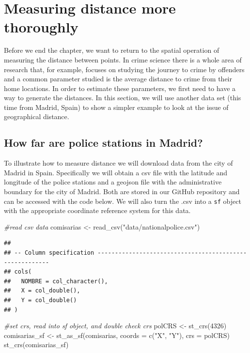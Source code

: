 \documentclass[
]{book}
\newenvironment{Shaded}{\begin{snugshade}}{\end{snugshade}}
\newcommand{\AttributeTok}[1]{\textcolor[rgb]{0.77,0.63,0.00}{#1}}
\newcommand{\CommentTok}[1]{\textcolor[rgb]{0.56,0.35,0.01}{\textit{#1}}}
\newcommand{\DecValTok}[1]{\textcolor[rgb]{0.00,0.00,0.81}{#1}}
\newcommand{\FunctionTok}[1]{\textcolor[rgb]{0.00,0.00,0.00}{#1}}
\newcommand{\NormalTok}[1]{#1}
\newcommand{\OtherTok}[1]{\textcolor[rgb]{0.56,0.35,0.01}{#1}}
\newcommand{\StringTok}[1]{\textcolor[rgb]{0.31,0.60,0.02}{#1}}
\begin{document}
\hypertarget{measuring-distance-more-thoroughly}{%
\section{Measuring distance more thoroughly}\label{measuring-distance-more-thoroughly}}

Before we end the chapter, we want to return to the spatial operation of measuring the distance between points. In crime science there is a whole area of research that, for example, focuses on studying the journey to crime by offenders and a common parameter studied is the average distance to crime from their home locations. In order to estimate these parameters, we first need to have a way to generate the distances. In this section, we will use another data set (this time from Madrid, Spain) to show a simpler example to look at the issue of geographical distance.

\hypertarget{how-far-are-police-stations-in-madrid}{%
\subsection{How far are police stations in Madrid?}\label{how-far-are-police-stations-in-madrid}}

To illustrate how to measure distance we will download data from the city of Madrid in Spain. Specifically we will obtain a csv file with the latitude and longitude of the police stations and a geojson file with the administrative boundary for the city of Madrid. Both are stored in our GitHub repository and can be accessed with the code below. We will also turn the .csv into a \texttt{sf} object with the appropriate coordinate reference system for this data.

\begin{Shaded}
\begin{Highlighting}[]
\CommentTok{\#read csv data}
\NormalTok{comisarias }\OtherTok{\textless{}{-}} \FunctionTok{read\_csv}\NormalTok{(}\StringTok{"data/nationalpolice.csv"}\NormalTok{)}
\end{Highlighting}
\end{Shaded}

\begin{verbatim}
## 
## -- Column specification --------------------------------------------------------
## cols(
##   NOMBRE = col_character(),
##   X = col_double(),
##   Y = col_double()
## )
\end{verbatim}

\begin{Shaded}
\begin{Highlighting}[]
\CommentTok{\#set crs, read into sf object, and double check crs}
\NormalTok{polCRS }\OtherTok{\textless{}{-}} \FunctionTok{st\_crs}\NormalTok{(}\DecValTok{4326}\NormalTok{)}
\NormalTok{comisarias\_sf }\OtherTok{\textless{}{-}} \FunctionTok{st\_as\_sf}\NormalTok{(comisarias, }\AttributeTok{coords =} \FunctionTok{c}\NormalTok{(}\StringTok{"X"}\NormalTok{, }\StringTok{"Y"}\NormalTok{), }\AttributeTok{crs =}\NormalTok{ polCRS)}
\FunctionTok{st\_crs}\NormalTok{(comisarias\_sf)}
\end{Highlighting}
\end{Shaded}
\end{document}
